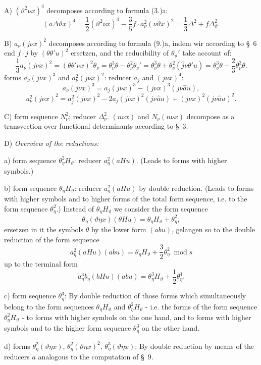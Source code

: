 \documentclass[11pt]{article}
\newcommand{\A}{\Delta}
\newcommand{\modu}[1]{\;\operatorname{mod} #1}
\providecommand{\modu}[1]{\;\operatorname{mod} #1}
\begin{document}
\noindent A) $(\vartheta^2\nu x)^4$ decomposes according to formula (3.)a:
\[
(a\A\vartheta x)^4=\frac12(\vartheta^2\nu x)^4-\frac35 f\cdot a_\nu^2(\nu\vartheta x)^2
=\frac13\A^2+f\A_\vartheta^2.
\]

\noindent B) $a_\nu(j\nu x)^2$ decomposes according to formula (9.)a, indem wir according to \S\ 6 end $f\cdot j$ by $(\theta\theta'u)^2$ ersetzen, and the reducibility of $\theta_\vartheta'$ take account of:
\[
\frac13a_\nu(j\nu x)^2=(\theta\theta'\nu x)^2\theta_\nu
=\theta_\nu^3\theta-\theta_\nu^2\theta_\nu'
=\theta_\nu^3\theta+\theta_\nu^2(\widehat{j}\nu\theta'u)
=\theta_\nu^3\theta-\frac23\theta_\nu^3\theta.
\]
forms $a_\nu(j\nu x)^3$ and $a_\nu^2(j\nu x)^2$: reducer $a_j$ and $(j\nu x)^4$:
\[
a_\nu(j\nu x)^3=a_j(j\nu x)^3-(j\nu x)^3(j\nu\widehat{a}u),
\]
\[
a_\nu^2(j\nu x)^2=a_j^2(j\nu x)^2-2a_j(j\nu x)^2(j\nu\widehat{a}u)+(j\nu x)^2(j\nu\widehat{a}u)^2.
\]

\noindent C) form sequence $N_\nu^2$; reducer $\A_\nu^2$. $(n\nu x)$ and $N_\nu(n\nu x)$ decompose as a transvection over functional determinants according to \S\ 3.

\noindent D) \emph{Overview of the reductions:}

a) form sequence $\theta_\eta^2H_\vartheta$: reducer $a_\eta^2(aHu)$. (Leads to forms with higher symbols.)

b) form sequence $\theta_\eta H_\vartheta$: reducer $a_\eta^2(aHu)$ by double reduction. (Leads to forms with higher symbols and to higher forms of the total form sequence, i.e. to the form sequence $\theta_\eta^2$.) Instead of $\theta_\eta H_\vartheta$ we consider the form sequence
\[
\theta_\eta(\vartheta\eta x)(\theta Hu)=\theta_\eta H_\vartheta+\theta_\eta^2,
\]
ersetzen in it the symbols $\theta$ by the lower form $(abu)$, gelangen so to the double reduction of the form sequence
\[
a_\eta^2(aHu)(abu)=\theta_\eta H_\vartheta+\frac32\theta_\eta^2\modu{s}
\]
up to the terminal form
\[
a_\eta^3b_\eta(bHu)(abu)=\theta_\eta^3H_\vartheta+\frac12\theta_\eta^4.
\]

c) form sequence $\theta_\eta^3$: By double reduction of those forms which simultaneously belong to the form sequences $\theta_\eta H_\vartheta$ and $\theta_\eta^2H_\vartheta$ - i.e. the forms of the form sequence $\theta_\eta^2H_\vartheta$ - to forms with higher symbols on the one hand, and to forms with higher symbols and to the higher form sequence $\theta_\eta^3$ on the other hand.

d) forms $\theta_\eta^2(\vartheta\eta x)$, $\theta_\eta^2(\vartheta\eta x)^2$, $\theta_\eta^3(\vartheta\eta x)$: By double reduction by means of the reducers $a$ analogous to the computation of \S\ 9.
\end{document}
